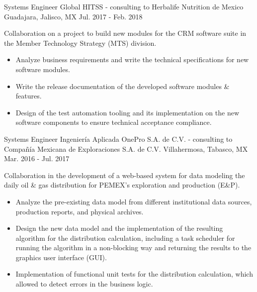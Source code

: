 \begin{cventries}
	
	\cventry
	{Systems Engineer} %
	{Global HITSS - consulting to Herbalife Nutrition de Mexico} %
	{Guadajara, Jalisco, MX} %
	{Jul. 2017 - Feb. 2018} %
	{ %
		\begin{cvitems}
			\item {Collaboration on a project to build new modules for the CRM software suite in the Member Technology Strategy (MTS) division.}
			\begin{itemize}
				\item {Analyze business requirements and write the technical specifications for new software modules.}
				\item {Write the release documentation of the developed software modules \& features.}
				\item {Design of the test automation tooling and its implementation on the new software components to ensure technical acceptance compliance.}
			\end{itemize}
		\end{cvitems}
	}
	


\cventry
{Systems Engineer} %
{Ingeniería Aplicada OnePro S.A. de C.V. - consulting to Compañía Mexicana de Exploraciones S.A. de C.V.} %
{Villahermosa, Tabasco, MX} %
{Mar. 2016 - Jul. 2017} %
{ %
	\begin{cvitems}
		\item {Collaboration in the development of a web-based system for data modeling the daily oil \& gas distribution for PEMEX's exploration and production (E\&P).}
		\begin{itemize}
			\item {Analyze the pre-existing data model from different institutional data sources, production reports, and physical archives.}
			\item {Design the new data model and the implementation of the resulting algorithm for the distribution calculation, including a task scheduler for running the algorithm in a non-blocking way and returning the results to the graphics user interface (GUI).}
			\item {Implementation of functional unit tests for the distribution calculation, which allowed to detect errors in the business logic.}
		\end{itemize}
	\end{cvitems}
}


\end{cventries}
